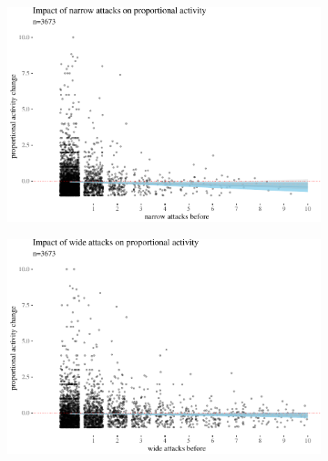 \documentclass[10pt,]{scrartcl}
\begin{document}
\begin{figure}
\begin{subfigure}[b]{0.75\textwidth}

\begin{center}\includegraphics[width=1\linewidth]{redditAnalysisWalkthrough_files/figure-latex/unnamed-chunk-17-1} \end{center}
\end{subfigure}
 
 \vspace{3mm}
\begin{subfigure}[b]{0.75\textwidth}

\begin{center}\includegraphics[width=1\linewidth]{redditAnalysisWalkthrough_files/figure-latex/unnamed-chunk-18-1} \end{center}
\end{subfigure}



\end{figure}
\end{document}
